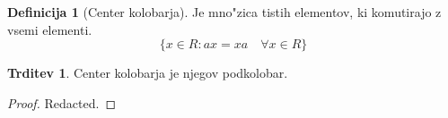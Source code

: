 \documentclass[11pt, a4paper]{article}
\theoremstyle{definition}
\newtheorem{defn}[counter]{Definicija}
\newtheorem{claim}[counter]{Trditev}
\theoremstyle{remark}
\begin{document}
	\begin{defn}[Center kolobarja]
		Je mno"zica tistih elementov, ki komutirajo z vsemi elementi.
		\[ \lbrace x \in R: ax = xa \quad \forall x \in R \rbrace \]
	\end{defn}
	\begin{claim}
		Center kolobarja je njegov podkolobar.
	\end{claim}
	\begin{proof}
		Redacted.
	\end{proof}

\end{document}
